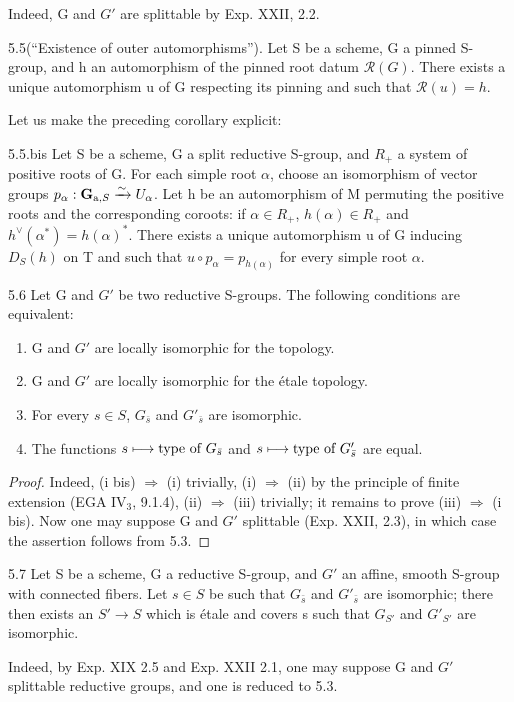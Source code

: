 Indeed, G and $G'$ are splittable by Exp. XXII, 2.2.
\begin{corollary}{5.5}\label{XXIII.5.5}\textup{(``Existence of outer automorphisms'').}
Let S be a scheme, G a pinned S-group, and h an automorphism of the pinned root datum $\mathscr R(G)$. There exists a unique automorphism u of G respecting its pinning and such that $\mathscr R(u)=h$.
\end{corollary}
Let us make the preceding corollary explicit:
\begin{corollary}{5.5.bis}\label{XXIII.5.5.bis}
Let S be a scheme, G a split reductive S-group, and $R_+$ a system of positive roots of G. For each simple root $\alpha$, choose an isomorphism of vector groups $p_\alpha:\mathbf G_{\mathrm a,S}\xrightarrow{\sim} U_\alpha$. Let h be an automorphism of M permuting the positive roots and the corresponding coroots: if $\alpha\in R_+$, $h(\alpha)\in R_+$ and $h^\vee(\alpha^*)=h(\alpha)^*$. There exists a unique automorphism u of G inducing $D_S(h)$ on T and such that $u\circ p_\alpha=p_{h(\alpha)}$ for every simple root $\alpha$.
\end{corollary}
\begin{corollary}{5.6}\label{XXIII.5.6}
Let G and $G'$ be two reductive S-groups. The following conditions are equivalent:
\begin{enumerate}[label={},leftmargin=3.5em]
\item[(i)] G and $G'$ are locally isomorphic for the \fpqc topology.
\item[(i bis)] G and $G'$ are locally isomorphic for the étale topology.
\item[(ii)] For every $s\in S$, $G_{\bar s}$ and $G'_{\bar s}$ are isomorphic.
\item[(iii)] The functions $s\longmapsto\text{type of }G_{\bar s}$ and $s\longmapsto\text{type of }G'_{\bar s}$ are equal.
\end{enumerate}
\end{corollary}
\begin{proof}
Indeed, (i bis) $\Rightarrow$ (i) trivially, (i) $\Rightarrow$ (ii) by the principle of finite extension (EGA IV$_3$, 9.1.4), (ii) $\Rightarrow$ (iii) trivially; it remains to prove (iii) $\Rightarrow$ (i bis). Now one may suppose G and $G'$ splittable (Exp. XXII, 2.3), in which case the assertion follows from 5.3.
\end{proof}
\begin{corollary}{5.7}\label{XXIII.5.7}
Let S be a scheme, G a reductive S-group, and $G'$ an affine, smooth S-group with connected fibers. Let $s\in S$ be such that $G_{\bar s}$ and $G'_{\bar s}$ are isomorphic; there then exists an $S'\to S$ which is étale and covers s such that $G_{S'}$ and $G'_{S'}$ are isomorphic.
\end{corollary}
Indeed, by Exp. XIX 2.5 and Exp. XXII 2.1, one may suppose G and $G'$ splittable reductive groups, and one is reduced to 5.3.

